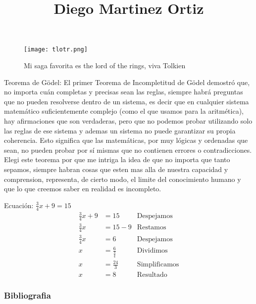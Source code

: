 \documentclass[11pt]{beamer}
\title{Diego Martinez Ortiz}
\begin{document}
\begin{frame}
  \titlepage
  \begin{figure}[h!]
    \centering
    \texttt{[image: tlotr.png]}
    \caption{Mi saga favorita es the lord of the rings, viva Tolkien}
    \label{fig.tlotr}
    \end{figure}
\end{frame}







\begin{frame}{Teorema de Gödel: \cite{paginaweb}}
  El primer Teorema de Incompletitud de Gödel demostró que, no importa cuán completas y precisas sean las reglas, siempre habrá preguntas que no pueden resolverse dentro de un sistema, es decir que en cualquier sistema matemático suficientemente complejo (como el que usamos para la aritmética), hay afirmaciones que son verdaderas, pero que no podemos probar utilizando solo las reglas de ese sistema y ademas un sistema no puede garantizar su propia coherencia. Esto significa que las matemáticas, por muy lógicas y ordenadas que sean, no pueden probar por sí mismas que no contienen errores o contradicciones.
  Elegi este teorema por que me intriga la idea de que no importa que tanto sepamos, siempre habran cosas que esten mas alla de nuestra capacidad y comprension, representa, de cierto modo, el limite del conocimiento humano y que lo que creemos saber en realidad es incompleto.
\end{frame}


\begin{frame}
        Ecuación: $\frac{3}{4}x+9 =15$
        \begin{align*}
           \frac{3}{4}x+9 &=15 &\text{Despejamos}\\
           \frac{3}{4}x &= 15-9 &\text{Restamos}\\
           \frac{3}{4}x &= 6 &\text{Despejamos}\\
           x &= \frac{6}{\frac{3}{4}} &\text{Dividimos}\\
           x &= \frac{24}{3} &\text{Simplificamos}\\
           x &= 8 &\text{Resultado}
        \end{align*}
\end{frame}


\begin{frame}
  
  \frametitle{Bibliografia}

  
  
  
  
\end{frame}
\end{document}
